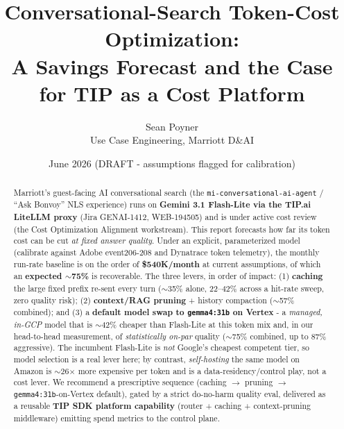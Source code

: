 \documentclass[11pt]{article}
\title{\textbf{Conversational-Search Token-Cost Optimization:\\
A Savings Forecast and the Case for TIP as a Cost Platform}}
\author{Sean Poyner \\ \small Use Case Engineering, Marriott D\&AI}
\date{June 2026 \quad\small(DRAFT - assumptions flagged for calibration)}
\newcommand{\code}[1]{\texttt{\small #1}}
\begin{document}
\maketitle

\begin{abstract}
Marriott's guest-facing AI conversational search (the \code{mi-conversational-ai-agent} /
``Ask Bonvoy'' NLS experience) runs on \textbf{Gemini 3.1 Flash-Lite via the TIP.ai LiteLLM
proxy} (Jira GENAI-1412, WEB-194505) and is under active cost review (the Cost Optimization
Alignment workstream). This report forecasts how far its token cost can be cut \emph{at fixed
answer quality}. Under an explicit, parameterized model (calibrate against Adobe event206-208
and Dynatrace token telemetry), the monthly run-rate baseline is on the order of
\textbf{\$540K/month} at current assumptions, of which an \textbf{expected $\sim$75\%} is
recoverable. The three levers, in order of impact: (1) \textbf{caching} the large fixed prefix
re-sent every turn ($\sim$35\% alone, 22--42\% across a hit-rate sweep, zero quality risk);
(2) \textbf{context/RAG pruning} + history compaction ($\sim$57\% combined); and (3) a
\textbf{default model swap to \code{gemma4:31b} on Vertex} - a \emph{managed, in-GCP} model that
is $\sim$42\% cheaper than Flash-Lite at this token mix and, in our head-to-head measurement, of
\emph{statistically on-par} quality ($\sim$75\% combined, up to 87\% aggressive). The incumbent
Flash-Lite is \emph{not} Google's cheapest competent tier, so model selection is a real lever
here; by contrast, \emph{self-hosting} the same model on Amazon is $\sim$26$\times$ more
expensive per token and is a data-residency/control play, not a cost lever. We recommend a
prescriptive sequence (caching $\rightarrow$ pruning $\rightarrow$ \code{gemma4:31b}-on-Vertex
default), gated by a strict do-no-harm quality eval, delivered as a reusable \textbf{TIP SDK
platform capability} (router + caching + context-pruning middleware) emitting spend metrics to
the control plane.
\end{abstract}
\end{document}

